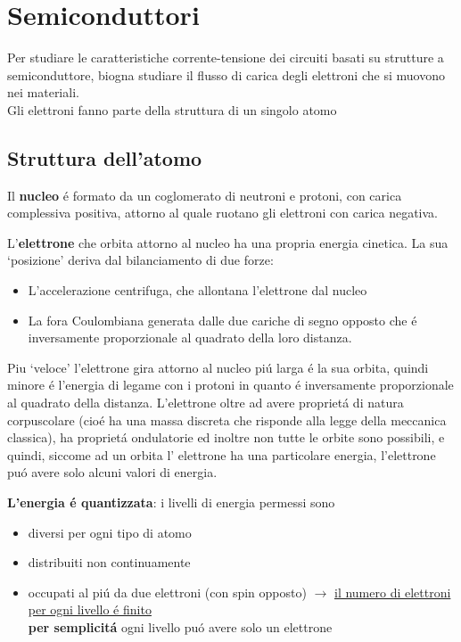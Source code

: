 \documentclass{article}
\begin{document}
\section{Semiconduttori}
Per studiare le caratteristiche corrente-tensione dei circuiti basati su strutture a semiconduttore, biogna studiare il flusso di carica degli elettroni che si muovono nei materiali.\\
Gli elettroni fanno parte della struttura di un singolo atomo

\subsection{Struttura dell'atomo}

Il \textbf{nucleo} \'e formato da un coglomerato di neutroni e protoni, con carica complessiva positiva, attorno al quale ruotano gli elettroni con carica negativa.

L'\textbf{elettrone} che orbita attorno al nucleo ha una propria energia cinetica. La sua `posizione' deriva dal bilanciamento di due forze:
\begin{itemize}
    \item L'accelerazione centrifuga, che allontana l'elettrone dal nucleo
    \item La fora Coulombiana generata dalle due cariche di segno opposto che \'e inversamente proporzionale al quadrato della loro distanza.
\end{itemize}

Piu `veloce' l'elettrone gira attorno al nucleo pi\'u larga \'e la sua orbita, quindi minore \'e l'energia di legame con i protoni in quanto \'e inversamente proporzionale al quadrato della distanza.
L'elettrone oltre ad avere propriet\'a di natura corpuscolare (cio\'e ha una massa discreta che risponde alla legge della meccanica classica), ha propriet\'a ondulatorie ed inoltre non tutte le orbite sono possibili, e quindi, siccome ad un orbita l' elettrone ha una particolare energia, l'elettrone pu\'o avere solo alcuni valori di energia.

\textbf{L'energia \'e quantizzata}: i livelli di energia permessi sono
\begin{itemize}
    \item diversi per ogni tipo di atomo
    \item distribuiti non continuamente
    \item occupati al pi\'u da due elettroni (con spin opposto) $\rightarrow$ \underline{il numero di elettroni per ogni livello \'e finito}\\
        \textbf{per semplicit\'a} ogni livello pu\'o avere solo un elettrone
\end{itemize}
\end{document}
